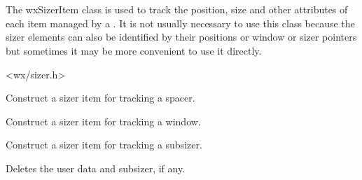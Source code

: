 
\section{}\label{wxsizeritem}

The wxSizerItem class is used to track the position, size and other
attributes of each item managed by a . It is not
usually necessary to use this class because the sizer elements can also be
identified by their positions or window or sizer pointers but sometimes it may
be more convenient to use it directly.





<wx/sizer.h>






\label{wxsizeritemwxsizeritem}


Construct a sizer item for tracking a spacer.




Construct a sizer item for tracking a window.




Construct a sizer item for tracking a subsizer.



\label{wxsizeritemdtor}


Deletes the user data and subsizer, if any.


